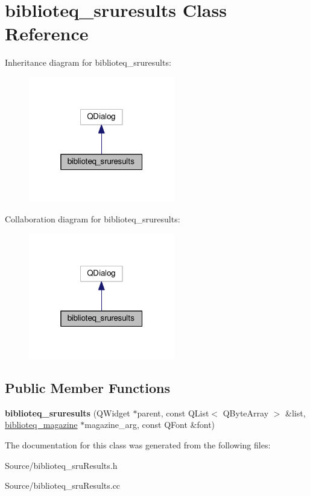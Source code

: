 \hypertarget{classbiblioteq__sruresults}{}\section{biblioteq\+\_\+sruresults Class Reference}
\label{classbiblioteq__sruresults}


Inheritance diagram for biblioteq\+\_\+sruresults\+:
\nopagebreak
\begin{figure}[H]
\begin{center}
\leavevmode
\includegraphics[width=181pt]{classbiblioteq__sruresults__inherit__graph}
\end{center}
\end{figure}


Collaboration diagram for biblioteq\+\_\+sruresults\+:
\nopagebreak
\begin{figure}[H]
\begin{center}
\leavevmode
\includegraphics[width=181pt]{classbiblioteq__sruresults__coll__graph}
\end{center}
\end{figure}
\subsection*{Public Member Functions}
\begin{DoxyCompactItemize}
\item 
{\bfseries biblioteq\+\_\+sruresults} (Q\+Widget $\ast$parent, const Q\+List$<$ Q\+Byte\+Array $>$ \&list, \hyperlink{classbiblioteq__magazine}{biblioteq\+\_\+magazine} $\ast$magazine\+\_\+arg, const Q\+Font \&font)\hypertarget{classbiblioteq__sruresults_a6d5677e14e69a168c05679f9db7ecf7c}{}\label{classbiblioteq__sruresults_a6d5677e14e69a168c05679f9db7ecf7c}

\end{DoxyCompactItemize}


The documentation for this class was generated from the following files\+:\begin{DoxyCompactItemize}
\item 
Source/biblioteq\+\_\+sru\+Results.\+h\item 
Source/biblioteq\+\_\+sru\+Results.\+cc\end{DoxyCompactItemize}
